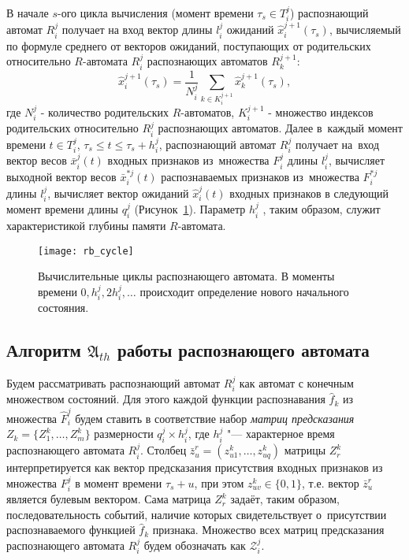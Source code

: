 В начале $s$-ого цикла вычисления (момент времени $\tau_s\in{T_i^j}$)  распознающий автомат $R_i^j$ получает на вход вектор длины $l_i^j$ ожиданий $\hat{x}_i^{j+1}(\tau_s)$, вычисляемый по формуле среднего от векторов ожиданий, поступающих от родительских относительно $R$-автомата $R_i^j$ распознающих автоматов $R_k^{j+1}$:
\begin{equation}
	\hat{x}_i^{j+1}(\tau_s)=\frac{1}{N_i^j}\sum_{k{\in}K_i^{j+1}}\hat{x}_k^{j+1}(\tau_s),
\end{equation}
где $N_i^j$ - количество родительских $R$-автоматов, $K_i^{j+1}$ - множество индексов родительских относительно $R_i^j$ распознающих автоматов. Далее в~каждый момент времени $t\in{T_i^j}$, $\tau_s\leqslant{t}\leqslant\tau_s+h_i^j$,  распознающий автомат $R_i^j$ получает на~вход вектор весов $\bar{x}_i^j(t)$ входных признаков из~множества $F_i^j$ длины $l_i^j$, вычисляет выходной вектор весов $\bar{x}_i^{*j}(t)$ распознаваемых признаков из~множества $F_i^{*j}$ длины $l_i^j$, вычисляет вектор ожиданий $\hat{x}_i^j(t)$ входных признаков в следующий момент времени длины $q_i^j$ (Рисунок~\ref{fig:rb_cycle}). Параметр $h_i^j$ , таким образом, служит характеристикой глубины памяти $R$-автомата.
	
\begin{figure}[h]
	\centering
	\texttt{[image: rb\_cycle]}
	\caption{Вычислительные циклы распознающего автомата. В моменты времени $0,h_i^j,2h_i^j,\dots$ происходит определение нового начального состояния.}
	\label{fig:rb_cycle}  
\end{figure}

\subsection{Алгоритм $\mathfrak A_{th}$ работы распознающего автомата}\label{subsect:rb_algorithm}

Будем рассматривать распознающий автомат $R_i^j$ как автомат с конечным множеством состояний. Для этого каждой функции распознавания $\hat{f}_k$ из множества $\hat{F}_i^j$ будем ставить в соответствие набор \textit{матриц предсказания} $Z_k=\{Z_1^k,…,Z_m^k\}$ размерности $q_i^j\times h_i^j$, где $h_i^j$ "--- характерное время распознающего автомата $R_i^j$. Столбец $\bar{z}_u^r=(z_{u1}^k,…,z_{uq}^k)$ матрицы $Z_r^k$ интерпретируется как вектор предсказания присутствия входных признаков из множества $F_i^j$ в момент времени $\tau_s+u$, при этом $z_{uv}^k\in\{0,1\}$, т.е. вектор $\bar{z}_u^r$ является булевым вектором. Сама матрица $Z_r^k$ задаёт, таким образом, последовательность событий, наличие которых свидетельствует о~присутствии распознаваемого функцией $\hat{f}_k$ признака. Множество всех матриц предсказания распознающего автомата $R_i^j$ будем обозначать как $\mathcal{Z}_i^j$.

